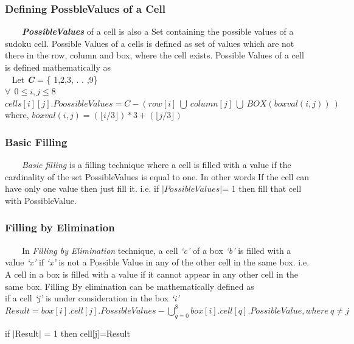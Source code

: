 \documentclass[12pt,a4paper]{article}
\begin{document}
\subsubsection{Defining PossbleValues of a Cell}
\ \ \ \ \textit{\textbf{PossibleValues}} of a cell is also a Set containing the possible values of a sudoku cell. Possible Values of a cells is defined as set of values which are not there in the row, column and box, where the cell exists. Possible Values of a cell is defined mathematically as\\
\ \newline
Let \textit{\textbf{C}} = \{ 1,2,3, . . ,9\}\\
$\forall \ \  0 \leq i, j \leq 8$ \\
$cells[i][j].PoossibleValues = C - ( row[i] \ \bigcup \ column[j] \ \bigcup \ BOX(boxval(i,j))\ )$\\
where,
$boxval(i,j)= (\lfloor i/3 \rfloor)*3 + (\lfloor j/3 \rfloor)$

\subsubsection{Basic Filling}
\ \ \ \ \textit{Basic filling} is a filling technique where a cell is filled with a value if the cardinality of the set PossibleValues is equal to one. In other words  If the cell can have only one value then just fill it. i.e. if $\vert PossibleValues \vert $= 1 then fill that cell with PossibleValue. \\

\subsubsection{Filling by Elimination}
\ \ \ \ In \textit{Filling by Elimination} technique, a cell \textit{`c'} of a box \textit{`b'} is filled with a value \textit{`x'} if \textit{`x'} is not a Possible Value in any of the other cell in the same box. i.e. A cell in a box is filled with a value if it cannot appear in any other cell in the same box. Filling By elimination can be mathematically defined as \\

if a cell \textit{`j'} is under consideration in the box \textit{`i'}\\

$Result = box[i].cell[j].PossibleValues - \bigcup\limits_{q=0}^8 box[i].cell[q].PossibleValue, where\  q \neq j$

if $\vert$Result$\vert$ = 1 then cell[j]=Result
\end{document}
